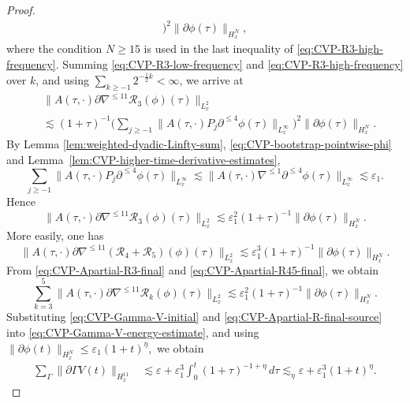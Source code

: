 \documentclass[11pt,twoside]{article}
\def\ds{\displaystyle}
\def\f{\frac}
\def\p{\partial}
\def\ve{\varepsilon}
\def\ls{\lesssim}
\theoremstyle{plain}
\theoremstyle{definition}
\theoremstyle{assumption}
\numberwithin{equation}{section}
\begin{document}
\begin{proof}
\begin{equation}
\begin{aligned}
				\big)^2
				\|\p\phi(\tau)\|_{H^{N}_x},
			\end{aligned}
		\end{equation}
		where the condition $N\ge 15$ is used in the last inequality of \eqref{eq:CVP-R3-high-frequency}.
		Summing \eqref{eq:CVP-R3-low-frequency} and
		\eqref{eq:CVP-R3-high-frequency} over \(k\), and using
		$\ds\sum_{k\ge -1}2^{-\f12 k}<\infty$,
		we arrive at
		\begin{equation}
			\label{eq:CVP-Apartial-R3-before-bootstrap}
			\begin{aligned}
				&
				\|A(\tau,\cdot)\p\nabla^{\le 11}
				\mathcal R_3(\phi)(\tau)\|_{L^2_x}
				\\
				&\ls
				(1+\tau)^{-1}
				\big(
				\sum_{j\ge-1}
				\|A(\tau,\cdot)P_j\p^{\le4}\phi(\tau)\|_{L^\infty_x}
				\big)^2
				\|\p\phi(\tau)\|_{H^N_x}.
			\end{aligned}
		\end{equation}
		By Lemma \ref{lem:weighted-dyadic-Linfty-sum}, \eqref{eq:CVP-bootstrap-pointwise-phi} and
		Lemma~\ref{lem:CVP-higher-time-derivative-estimates},
		\[
		\sum_{j\ge-1}
		\|A(\tau,\cdot)P_j\p^{\le4}\phi(\tau)\|_{L^\infty_x}
		\ls
		\|A(\tau,\cdot)\nabla^{\le 1}\p^{\le 4}\phi(\tau)\|_{L^\infty_x}
		\ls
		\ve_1.
		\]
		Hence
		\begin{equation}
			\label{eq:CVP-Apartial-R3-final}
			\|A(\tau,\cdot)\p\nabla^{\le 11}
			\mathcal R_3(\phi)(\tau)\|_{L^2_x}
			\ls
			\ve_1^2(1+\tau)^{-1}
			\|\p\phi(\tau)\|_{H^N_x}.
		\end{equation}
		More easily, one has
		\begin{equation}
			\label{eq:CVP-Apartial-R45-final}
			\|A(\tau,\cdot)\p\nabla^{\le 11}
			(\mathcal R_4+\mathcal R_5)(\phi)(\tau)\|_{L^2_x}
			\ls
			\ve_1^3(1+\tau)^{-1}
			\|\p\phi(\tau)\|_{H^N_x}.
		\end{equation}
		From \eqref{eq:CVP-Apartial-R3-final} and
		\eqref{eq:CVP-Apartial-R45-final}, we obtain
		\begin{equation}
			\label{eq:CVP-Apartial-R-final-source}
			\sum_{k=3}^{5}
			\|A(\tau,\cdot)\p\nabla^{\le 11}
			\mathcal R_k(\phi)(\tau)\|_{L^2_x}
			\ls
			\ve_1^2(1+\tau)^{-1}
			\|\p\phi(\tau)\|_{H^N_x}.
		\end{equation}
		Substituting
		\eqref{eq:CVP-Gamma-V-initial} and
		\eqref{eq:CVP-Apartial-R-final-source} into
		\eqref{eq:CVP-Gamma-V-energy-estimate}, and using
		$\|\p\phi(t)\|_{H^N_x}
		\le\ve_1(1+t)^\eta,
		$
		we obtain
		\begin{equation}
			\label{eq:CVP-Gamma-V-final}
			\begin{aligned}
				\sum_{\Gamma}
				\|\p\Gamma V(t)\|_{H^{11}_x}
				&\ls
				\ve
				+
				\ve_1^3
				\int_0^t
				(1+\tau)^{-1+\eta}\,d\tau
				\ls_\eta
				\ve
				+
				\ve_1^3(1+t)^\eta.
			\end{aligned}
		\end{equation}
		

\end{proof}
\end{document}

